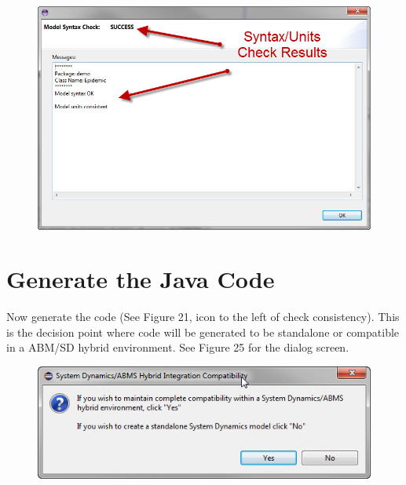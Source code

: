\documentclass[11pt]{amsart}
\begin{document}
\begin{figure}[ht]
\begin{center}
\vspace{.2in}
\centerline {
\includegraphics[totalheight=0.3\textheight]{images/024.jpg}
}
\caption{}
\label{fig:024}
\end{center}
\end{figure}

\section{Generate the Java Code}
Now generate the code (See Figure 21, icon to the left of check consistency). This is the decision point where code will be generated to be standalone or compatible in a ABM/SD hybrid environment. See Figure 25 for the dialog screen.

\begin{figure}[ht]
\begin{center}
\vspace{.2in}
\centerline {
\includegraphics[totalheight=0.3\textheight]{images/decision.jpg}
}
\caption{}
\label{fig:025}
\end{center}
\end{figure}
\end{document}
